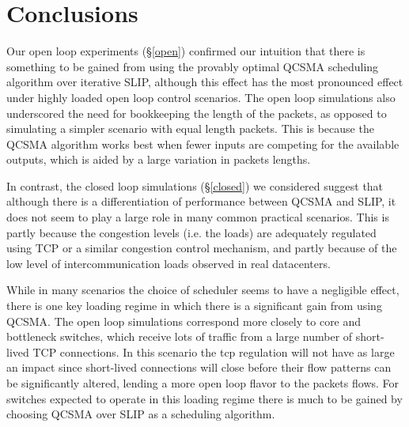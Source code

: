 \documentclass[11pt]{article}%
\begin{document}
\section{Conclusions}

Our open loop experiments (\S\ref{open}) confirmed our intuition that there is something to be gained from using the provably optimal QCSMA scheduling algorithm over iterative SLIP, although this effect has the most pronounced effect under highly loaded open loop control scenarios.  The open loop simulations also underscored the need for bookkeeping the length of the packets, as opposed to simulating a simpler scenario with equal length packets.  This is because the QCSMA algorithm works best when fewer inputs are competing for the available outputs, which is aided by a large variation in packets lengths.

In contrast, the closed loop simulations (\S \ref{closed}) we considered suggest that although there is a differentiation of performance between QCSMA and SLIP, it does not seem to play a large role in many common practical scenarios.  This is partly because the congestion levels (i.e. the loads) are adequately regulated using TCP or a similar congestion control mechanism, and partly because of the low level of intercommunication loads observed in real datacenters.

While in many scenarios the choice of scheduler seems to have a negligible effect, there is one key loading regime in which there is a significant gain from using QCSMA.  The open loop simulations correspond more closely to core and bottleneck switches, which receive lots of traffic from a large number of short-lived TCP connections.  In this scenario the tcp regulation will not have as large an impact since short-lived connections will close before their flow patterns can be significantly altered, lending a more open loop flavor to the packets flows.  For switches expected to operate in this loading regime there is much to be gained by choosing QCSMA over SLIP as a scheduling algorithm.
\end{document}
